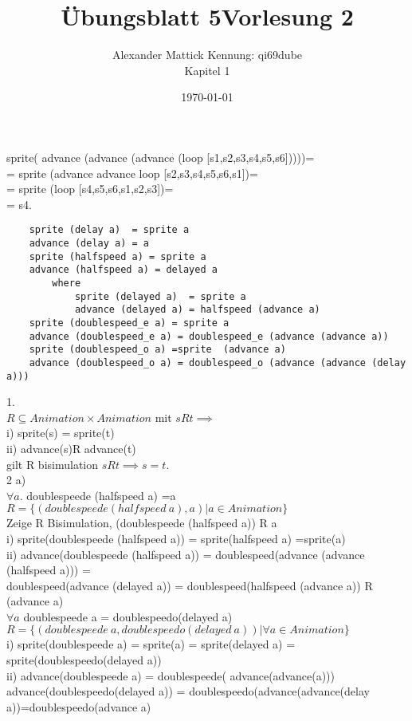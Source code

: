 \documentclass{article}
\title{Übungsblatt 5}
\author{
Alexander Mattick Kennung: qi69dube\\
Kapitel 1
}
\date{\today}
\title{Vorlesung 2}
\theoremstyle{definition}
\begin{document}
	\maketitle
	sprite( advance (advance (advance (loop [s1,s2,s3,s4,s5,s6]))))=\\
	= sprite (advance advance loop [s2,s3,s4,s5,s6,s1])=\\
	= sprite (loop [s4,s5,s6,s1,s2,s3])=\\
	= s4.\\
	\begin{verbatim}
	sprite (delay a)  = sprite a
	advance (delay a) = a
	sprite (halfspeed a) = sprite a
	advance (halfspeed a) = delayed a
		where
			sprite (delayed a)  = sprite a
			advance (delayed a) = halfspeed (advance a)
	sprite (doublespeed_e a) = sprite a
	advance (doublespeed_e a) = doublespeed_e (advance (advance a))
	sprite (doublespeed_o a) =sprite  (advance a)
	advance (doublespeed_o a) = doublespeed_o (advance (advance (delay a)))
	\end{verbatim}
	1.\\
	$R\subseteq Animation\times Animation$ mit $sRt\implies $\\
	i) sprite(s) = sprite(t)\\
	ii) advance(s)R advance(t)\\
	gilt R bisimulation $sRt\implies s=t$.\\
	2 a)\\
	$\forall a.$ doublespeede (halfspeed a) =a\\
	$R=\{(doublespeede(halfspeed\ a), a)|a\in Animation\}$\\
	Zeige R Bisimulation, (doublespeede (halfspeed a)) R a\\
	i)  sprite(doublespeede (halfspeed a)) = sprite(halfspeed a)  =sprite(a)\\
	ii)	advance(doublespeede (halfspeed a)) = doublespeed(advance (advance (halfspeed a))) =\\
	doublespeed(advance (delayed a)) = doublespeed(halfspeed (advance a)) R (advance a)\\
	$\forall a$ doublespeede a = doublespeedo(delayed a)\\
	$R=\{(doublespeede\ a,doublespeedo(delayed\ a))|\forall a\in Animation\}$\\
	i)  sprite(doublespeede a) = sprite(a) = sprite(delayed a) = sprite(doublespeedo(delayed a))\\
	ii) advance(doublespeede a) = doublespeede( advance(advance(a)))\\
	advance(doublespeedo(delayed a)) = doublespeedo(advance(advance(delay a))=doublespeedo(advance a)\\
\end{document}
